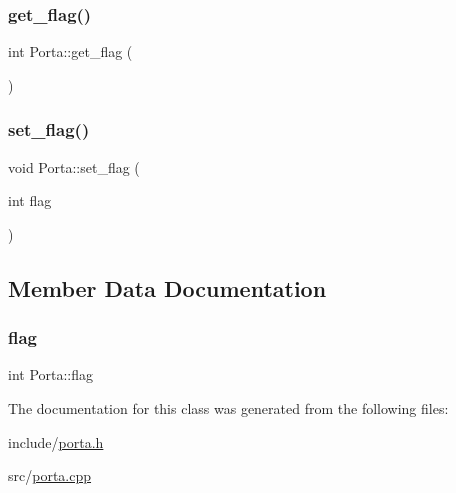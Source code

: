 \subsubsection{\texorpdfstring{get\+\_\+flag()}{get\_flag()}}
{\footnotesize\ttfamily int Porta\+::get\+\_\+flag (\begin{DoxyParamCaption}{ }\end{DoxyParamCaption})}

\mbox{\label{classPorta_a3ac51e6aa3d03be6bf01a73e748cf435}} 
\subsubsection{\texorpdfstring{set\+\_\+flag()}{set\_flag()}}
{\footnotesize\ttfamily void Porta\+::set\+\_\+flag (\begin{DoxyParamCaption}\item[{int}]{flag }\end{DoxyParamCaption})}



\subsection{Member Data Documentation}
\mbox{\label{classPorta_a8db544173490043789a14eaae3bf8ed6}} 
\subsubsection{\texorpdfstring{flag}{flag}}
{\footnotesize\ttfamily int Porta\+::flag\hspace{0.3cm}{\ttfamily [private]}}



The documentation for this class was generated from the following files\+:\begin{DoxyCompactItemize}
\item 
include/\hyperlink{porta_8h}{porta.\+h}\item 
src/\hyperlink{porta_8cpp}{porta.\+cpp}\end{DoxyCompactItemize}
